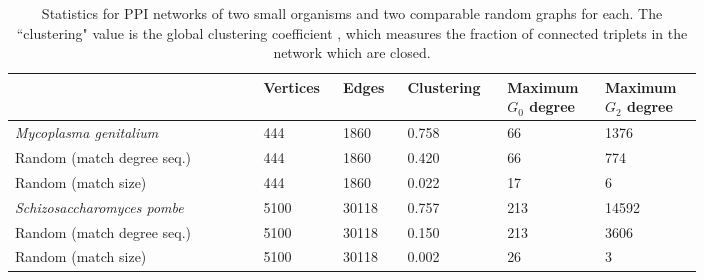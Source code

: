 \documentclass[12pt]{thesis}
\theoremstyle{plain}
\theoremstyle{definition}
\theoremstyle{remark}
\begin{document}
\begin{table}[t]
\centering
{\setlength\extrarowheight{3pt}\fontsize{11}{13}\selectfont
\begin{tabular}{L{0.31\linewidth}C{0.085\linewidth}C{0.08\linewidth}C{0.11\linewidth}C{0.11\linewidth}C{0.11\linewidth}}
\hline
 & Vertices & Edges & Clustering & Maximum $G_0$ degree & Maximum $G_2$ degree \\ \hline

\textit{Mycoplasma genitalium} & 444 & 1860 &  0.758 & 66 & 1376 \\ 
Random (match degree seq.) & 444 & 1860 & 0.420 & 66 & 774  \\ 
Random (match size) & 444 & 1860 &  0.022 & 17 & 6 \\ \hline
\textit{Schizosaccharomyces pombe} & 5100 & 30118 & 0.757 & 213 & 14592 \\ 
Random (match degree seq.) & 5100 & 30118 &  0.150 & 213 & 3606 \\ 
Random (match size) & 5100 & 30118 & 0.002 & 26 & 3 \\ \hline
\end{tabular}
}
\caption{Statistics for PPI networks of two small organisms and two comparable random graphs for each. The ``clustering" value is the global clustering coefficient \cite{newman2010}, which measures the fraction of connected triplets in the network which are closed.}
\label{tab:ppi_networks}
\end{table}
\end{document}
